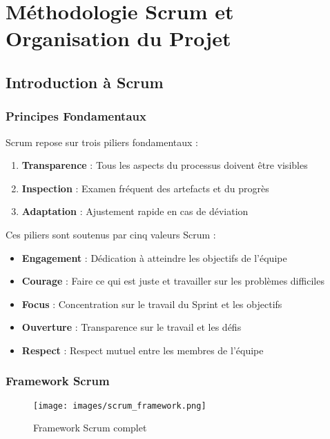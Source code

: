 \chapter{Méthodologie Scrum et Organisation du Projet}

\section{Introduction à Scrum}

\subsection{Principes Fondamentaux}

Scrum repose sur trois piliers fondamentaux :
\begin{enumerate}
    \item \textbf{Transparence} : Tous les aspects du processus doivent être visibles
    \item \textbf{Inspection} : Examen fréquent des artefacts et du progrès
    \item \textbf{Adaptation} : Ajustement rapide en cas de déviation
\end{enumerate}

Ces piliers sont soutenus par cinq valeurs Scrum :
\begin{itemize}
    \item \textbf{Engagement} : Dédication à atteindre les objectifs de l'équipe
    \item \textbf{Courage} : Faire ce qui est juste et travailler sur les problèmes difficiles
    \item \textbf{Focus} : Concentration sur le travail du Sprint et les objectifs
    \item \textbf{Ouverture} : Transparence sur le travail et les défis
    \item \textbf{Respect} : Respect mutuel entre les membres de l'équipe
\end{itemize}

\subsection{Framework Scrum}

\begin{figure}[H]
    \centering
    \texttt{[image: images/scrum\_framework.png]}
    \caption{Framework Scrum complet}
    \label{fig:scrum_framework}
\end{figure}

